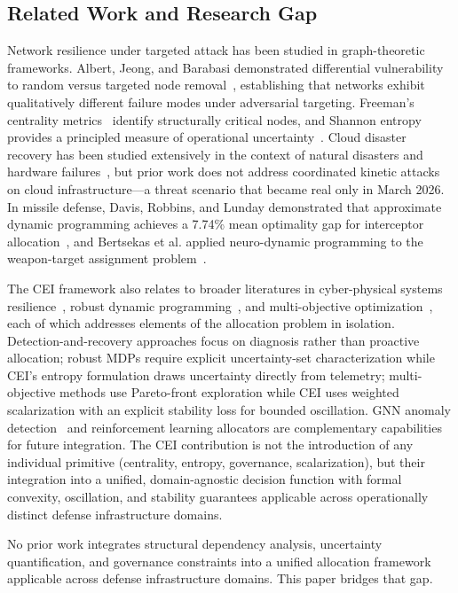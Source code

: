 \documentclass[runningheads]{llncs}
\begin{document}
\subsection{Related Work and Research Gap}

Network resilience under targeted attack has been studied in graph-theoretic frameworks. Albert, Jeong, and Barabasi demonstrated differential vulnerability to random versus targeted node removal~\cite{albert}, establishing that networks exhibit qualitatively different failure modes under adversarial targeting. Freeman's centrality metrics~\cite{freeman} identify structurally critical nodes, and Shannon entropy~\cite{shannon} provides a principled measure of operational uncertainty~\cite{cover}. Cloud disaster recovery has been studied extensively in the context of natural disasters and hardware failures~\cite{bala,gill}, but prior work does not address coordinated kinetic attacks on cloud infrastructure---a threat scenario that became real only in March 2026. In missile defense, Davis, Robbins, and Lunday demonstrated that approximate dynamic programming achieves a 7.74\% mean optimality gap for interceptor allocation~\cite{davis_adp}, and Bertsekas et al. applied neuro-dynamic programming to the weapon-target assignment problem~\cite{bertsekas}.

The CEI framework also relates to broader literatures in cyber-physical systems resilience~\cite{pasqualetti,sandberg}, robust dynamic programming~\cite{nilim,iyengar}, and multi-objective optimization~\cite{marler,deb}, each of which addresses elements of the allocation problem in isolation. Detection-and-recovery approaches focus on diagnosis rather than proactive allocation; robust MDPs require explicit uncertainty-set characterization while CEI's entropy formulation draws uncertainty directly from telemetry; multi-objective methods use Pareto-front exploration while CEI uses weighted scalarization with an explicit stability loss for bounded oscillation. GNN anomaly detection~\cite{deng} and reinforcement learning allocators are complementary capabilities for future integration. The CEI contribution is not the introduction of any individual primitive (centrality, entropy, governance, scalarization), but their integration into a unified, domain-agnostic decision function with formal convexity, oscillation, and stability guarantees applicable across operationally distinct defense infrastructure domains.

No prior work integrates structural dependency analysis, uncertainty quantification, and governance constraints into a unified allocation framework applicable across defense infrastructure domains. This paper bridges that gap.
\end{document}
